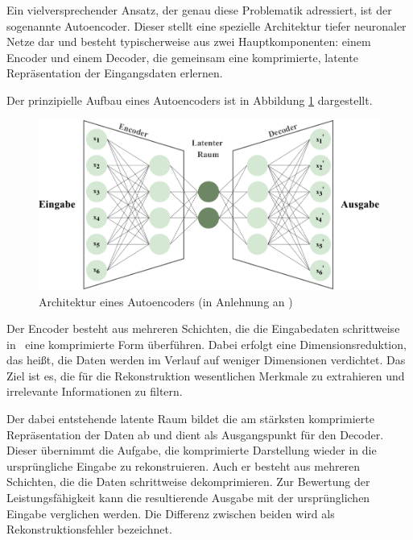 Ein vielversprechender Ansatz, der genau diese Problematik adressiert, ist der sogenannte Autoencoder. 
Dieser stellt eine spezielle Architektur tiefer neuronaler Netze dar und besteht typischerweise aus zwei Hauptkomponenten: einem Encoder und einem Decoder, die gemeinsam eine komprimierte, latente Repräsentation der Eingangsdaten erlernen.
\cite{Lempitsky2019}

Der prinzipielle Aufbau eines Autoencoders ist in Abbildung \ref{fig:Autoencoder} dargestellt.

\begin{figure}[htbp]
    \centering
    \includegraphics[width=1\textwidth]{Bilder/Autoencoder/AutoencoderModell.pdf}
    \caption[Architektur eines Autoencoders]{Architektur eines Autoencoders (in Anlehnung an \cite{AutoencoderBild})}
    \label{fig:Autoencoder}
\end{figure}

\vspace{-0.75em}
Der Encoder besteht aus mehreren Schichten, die die Eingabedaten schrittweise in%
\pagebreak
~eine komprimierte Form überführen. 
Dabei erfolgt eine Dimensionsreduktion, das heißt, die Daten werden im Verlauf auf weniger Dimensionen verdichtet. 
Das Ziel ist es, die für die Rekonstruktion wesentlichen Merkmale zu extrahieren und irrelevante Informationen zu filtern.

Der dabei entstehende latente Raum bildet die am stärksten komprimierte Repräsentation der Daten ab und dient als Ausgangspunkt für den Decoder.
Dieser übernimmt die Aufgabe, die komprimierte Darstellung wieder in die ursprüngliche Eingabe zu rekonstruieren. 
Auch er besteht aus mehreren Schichten, die die Daten schrittweise dekomprimieren.
Zur Bewertung der Leistungsfähigkeit kann die resultierende Ausgabe mit der ursprünglichen Eingabe verglichen werden. 
Die Differenz zwischen beiden wird als Rekonstruktionsfehler bezeichnet. \cite{Autoencoder}

